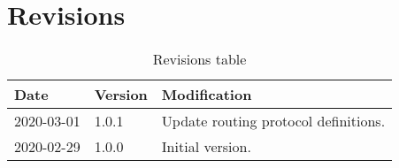 \section{Revisions}

\begin{table}[h]
  \centering
  \begin{tabular}{p{2cm} | p{2cm} | p{10cm}}
    \toprule\hline
    \textbf{Date} & \textbf{Version} & \textbf{Modification} \\
    \hline\hline
    2020-03-01 & 1.0.1 & Update routing protocol definitions. \\
    \hline
    2020-02-29 & 1.0.0 & Initial version. \\
    \hline\bottomrule
  \end{tabular}
  \caption{Revisions table}
  \label{revisions_table}
\end{table}
